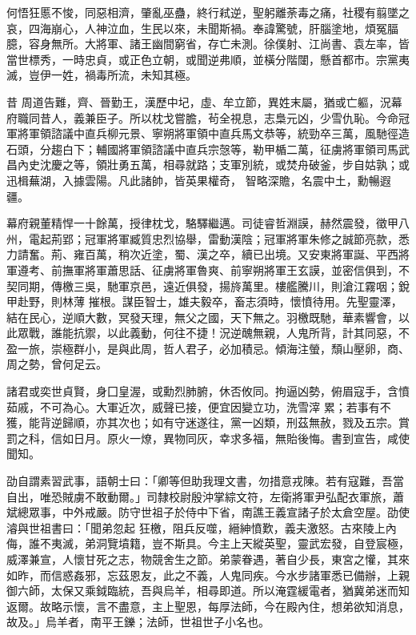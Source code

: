 \begin{pinyinscope}
 何悟狂慝不悛，同惡相濟，肇亂巫蠱，終行弒逆，聖躬離荼毒之痛，社稷有翦墜之哀，四海崩心，人神泣血，生民以來，未聞斯禍。奉諱驚號，肝腦塗地，煩冤腷臆，容身無所。大將軍、諸王幽間窮省，存亡未測。徐僕射、江尚書、袁左率，皆當世標秀，一時忠貞，或正色立朝，或聞逆弗順，並橫分階闥，懸首都市。宗黨夷滅，豈伊一姓，禍毒所流，未知其極。



 昔
 周道告難，齊、晉勤王，漢歷中圮，虛、牟立節，異姓末屬，猶或亡軀，況幕府職同昔人，義兼臣子。所以枕戈嘗膽，茍全視息，志梟元凶，少雪仇恥。今命冠軍將軍領諮議中直兵柳元景、寧朔將軍領中直兵馬文恭等，統勁卒三萬，風馳徑造石頭，分趨白下；輔國將軍領諮議中直兵宗愨等，勒甲楯二萬，征虜將軍領司馬武昌內史沈慶之等，領壯勇五萬，相尋就路；支軍別統，或焚舟破釜，步自姑孰；或迅楫蕪湖，入據雲陽。凡此諸帥，皆英果權奇，
 智略深贍，名震中土，勳暢遐疆。



 幕府親董精悍一十餘萬，授律枕戈，駱驛繼邁。司徒睿哲淵謨，赫然震發，徵甲八州，電起荊郢；冠軍將軍臧質忠烈協舉，雷動漢陰；冠軍將軍朱修之誠節亮款，悉力請奮。荊、雍百萬，稍次近塗，蜀、漢之卒，續已出境。又安東將軍誕、平西將軍遵考、前撫軍將軍蕭思話、征虜將軍魯爽、前寧朔將軍王玄謨，並密信俱到，不契同期，傳檄三吳，馳軍京邑，遠近俱發，揚旍萬里。樓艦騰川，則滄江霧咽；銳甲赴野，則林薄
 摧根。謀臣智士，雄夫毅卒，畜志須時，懷憤待用。先聖靈澤，結在民心，逆順大數，冥發天理，無父之國，天下無之。羽檄既馳，華素響會，以此眾戰，誰能抗禦，以此義動，何往不捷！況逆醜無親，人鬼所背，計其同惡，不盈一旅，崇極群小，是與此周，哲人君子，必加積忌。傾海注螢，頹山壓卵，商、周之勢，曾何足云。



 諸君或奕世貞賢，身囗皇渥，或勳烈肺腑，休否攸同。拘逼凶勢，俯眉寇手，含憤茹戚，不可為心。大軍近次，威聲已接，便宜因變立功，洗雪滓
 累；若事有不獲，能背逆歸順，亦其次也；如有守迷遂往，黨一凶類，刑茲無赦，戮及五宗。賞罰之科，信如日月。原火一燎，異物同灰，幸求多福，無貽後悔。書到宣告，咸使聞知。



 劭自謂素習武事，語朝士曰：「卿等但助我理文書，勿措意戎陳。若有寇難，吾當自出，唯恐賊虜不敢動爾。」司隸校尉殷沖掌綜文符，左衛將軍尹弘配衣軍旅，蕭斌總眾事，中外戒嚴。防守世祖子於侍中下省，南譙王義宣諸子於太倉空屋。劭使濬與世祖書曰：「聞弟忽起
 狂檄，阻兵反噬，縉紳憤歎，義夫激怒。古來陵上內侮，誰不夷滅，弟洞覽墳籍，豈不斯具。今主上天縱英聖，靈武宏發，自登宸極，威澤兼宣，人懷甘死之志，物競舍生之節。弟蒙眷遇，著自少長，東宮之懽，其來如昨，而信惑姦邪，忘茲恩友，此之不義，人鬼同疾。今水步諸軍悉已備辦，上親御六師，太保又乘鉞臨統，吾與烏羊，相尋即道。所以淹霆緩電者，猶冀弟迷而知返爾。故略示懷，言不盡意，主上聖恩，每厚法師，今在殿內住，想弟欲知消息，
 故及。」烏羊者，南平王鑠；法師，世祖世子小名也。




\end{pinyinscope}
